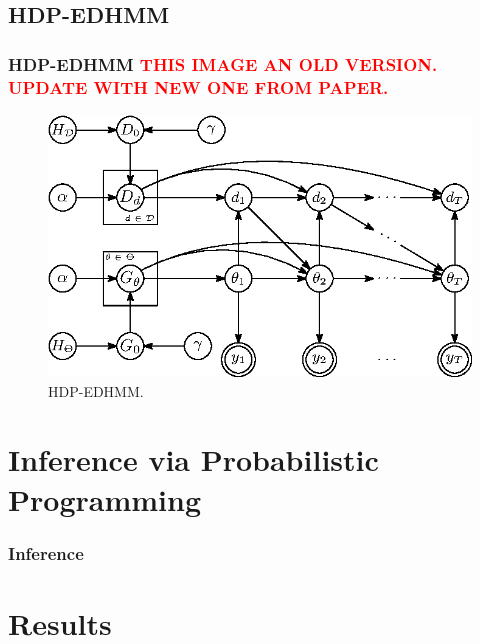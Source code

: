 \documentclass[aspectratio=169]{beamer}
\begin{document}

    \subsection{HDP-EDHMM}
    \begin{frame}
        \frametitle{HDP-EDHMM \textcolor{red}{THIS IMAGE AN OLD VERSION. UPDATE WITH NEW ONE FROM PAPER.}}

        \begin{figure}
            \includegraphics[width=1.0\linewidth]{HDPEDHMM.eps}
            \caption{HDP-EDHMM.}
        \end{figure}


    \end{frame}


    \section{Inference via Probabilistic Programming}
    \begin{frame}
        \frametitle{Inference}

    \end{frame}


    \section{Results}
\end{document}
